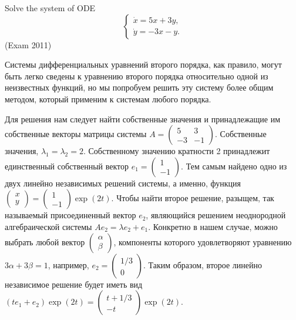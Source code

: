 \begin{problem}
Solve the system of ODE  
\[
\begin{cases} 
\dot{x}=5x+3y, \\ 
\dot{y}=-3x-y.
\end{cases} 
\]
(Exam 2011)
\end{problem}

\begin{solution}
Системы дифференциальных уравнений второго порядка, как правило, могут быть легко сведены к уравнению второго порядка относительно одной из неизвестных функций, но мы попробуем решить эту систему более общим методом, который применим к системам любого порядка. 

Для решения нам следует найти собственные значения и принадлежащие им собственные векторы матрицы системы $A=\left(\begin{array}{cc} {5} & {3} \\ {-3} & {-1} \end{array}\right)$. Собственные значения, $\lambda _{1} =\lambda _{2} =2$. Собственному значению кратности 2 принадлежит единственный собственный вектор $e_{1} =\left(\begin{array}{c} {1} \\ {-1} \end{array}\right)$. Тем самым найдено одно из двух линейно независимых решений системы, а именно, функция $\left(\begin{array}{c} {x} \\ {y} \end{array}\right)=\left(\begin{array}{c} {1} \\ {-1} \end{array}\right)\exp (2t)$. Чтобы найти второе решение, разыщем, так называемый присоединенный вектор $e_{2} $, являющийся решением неоднородной алгебраической системы $Ae_{2} =\lambda e_{2} +e_{1} $. Конкретно в нашем случае, можно выбрать любой вектор $\left(\begin{array}{c} {\alpha } \\ {\beta } \end{array}\right)$, компоненты которого удовлетворяют уравнению $3\alpha +3\beta =1$, например, $e_{2} =\left(\begin{array}{c} {1/3} \\ {0} \end{array}\right)$. Таким образом, второе линейно независимое решение будет иметь вид $(te_{1} +e_{2} )\exp (2t)=\left(\begin{array}{c} {t+1/3} \\ {-t} \end{array}\right)\exp (2t)$.


\end{solution}
